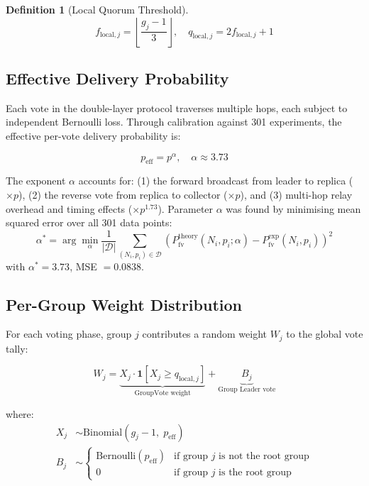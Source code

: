 \documentclass[
12pt,
oneside,
singlespacing,
parskip,
]{article}
\newtheorem{definition}{Definition}[section]
\begin{document}
\begin{definition}[Local Quorum Threshold]
\begin{equation}
  f_{\mathrm{local},j} = \left\lfloor \frac{g_j - 1}{3} \right\rfloor, \quad
  q_{\mathrm{local},j} = 2 f_{\mathrm{local},j} + 1
  \label{eq:qlocal}
\end{equation}
\end{definition}

\subsection{Effective Delivery Probability}

Each vote in the double-layer protocol traverses multiple hops, each subject to independent Bernoulli loss. Through calibration against 301 experiments, the effective per-vote delivery probability is:

\begin{equation}
  \boxed{p_\mathrm{eff} = p^{\alpha}, \quad \alpha \approx 3.73}
  \label{eq:peff}
\end{equation}

The exponent $\alpha$ accounts for: (1) the forward broadcast from leader to replica ($\times p$), (2) the reverse vote from replica to collector ($\times p$), and (3) multi-hop relay overhead and timing effects ($\times p^{1.73}$). Parameter $\alpha$ was found by minimising mean squared error over all 301 data points:
\[
  \alpha^* = \arg\min_{\alpha} \frac{1}{|\mathcal{D}|} \sum_{(N_i, p_i) \in \mathcal{D}} \left( P_\mathrm{fv}^\mathrm{theory}(N_i, p_i; \alpha) - P_\mathrm{fv}^\mathrm{exp}(N_i, p_i) \right)^2
\]
with $\alpha^* = 3.73$, MSE $= 0.0838$.

\subsection{Per-Group Weight Distribution}

For each voting phase, group $j$ contributes a random weight $W_j$ to the global vote tally:

\begin{equation}
  W_j = \underbrace{X_j \cdot \mathbf{1}[X_j \geq q_{\mathrm{local},j}]}_{\text{GroupVote weight}} + \underbrace{B_j}_{\text{Group Leader vote}}
  \label{eq:Wj}
\end{equation}

where:
\begin{align}
  X_j &\sim \mathrm{Binomial}(g_j - 1,\; p_\mathrm{eff}) \label{eq:Xj}\\
  B_j &\sim \begin{cases} \mathrm{Bernoulli}(p_\mathrm{eff}) & \text{if group } j \text{ is not the root group} \\ 0 & \text{if group } j \text{ is the root group} \end{cases} \label{eq:Bj}
\end{align}
\end{document}
